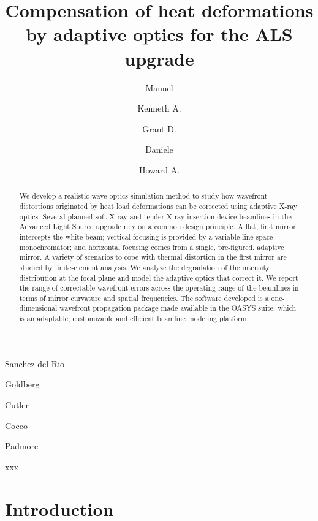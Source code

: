 \documentclass[preprint]{iucr}              %
\begin{document}

\title{Compensation of heat deformations by adaptive optics for the ALS upgrade}

\author[a]{Manuel}{Sanchez del Rio}
\author[a]{Kenneth A.}{Goldberg}
\author[a]{Grant D.}{Cutler}
\author[a]{Daniele}{Cocco}
\author[a]{Howard A.}{Padmore}

 
\maketitle

\begin{synopsis}
xxx 
\end{synopsis}

\begin{abstract}
We develop a realistic wave optics simulation method to study how wavefront distortions originated by heat load deformations can be corrected using adaptive X-ray optics. Several planned soft X-ray and tender X-ray insertion-device beamlines in the Advanced Light Source upgrade rely on a common design principle. A flat, first mirror intercepts the white beam; vertical focusing is provided by a variable-line-space monochromator; and horizontal focusing comes from a single, pre-figured, adaptive mirror. 
A variety of scenarios to cope with thermal distortion in the first mirror are studied by finite-element analysis. We analyze the degradation of the intensity distribution at the focal plane and model the adaptive optics that correct it. We report the range of correctable wavefront errors across the operating range of the beamlines in terms of mirror curvature and spatial frequencies. The software developed is a one-dimensional wavefront propagation package made available in the OASYS suite, which is an adaptable, customizable and efficient beamline modeling platform.
\end{abstract}



\section{Introduction}
\label{sec:intro}  
\end{document}
